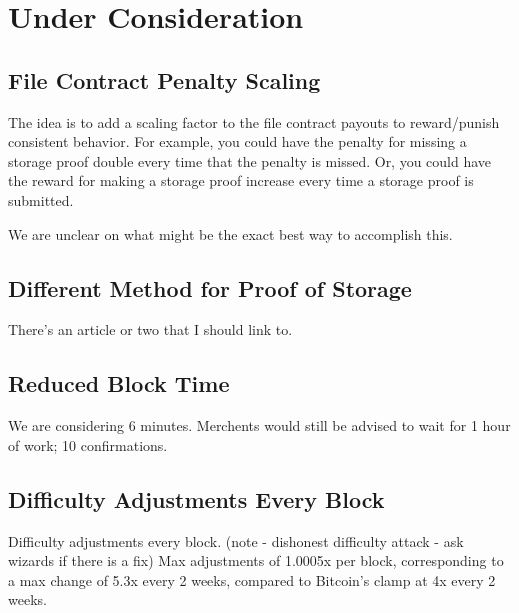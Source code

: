 \documentclass[twocolumn]{article}
\begin{document}

\section{Under Consideration}
\subsection{File Contract Penalty Scaling}
The idea is to add a scaling factor to the file contract payouts to reward/punish consistent behavior.
For example, you could have the penalty for missing a storage proof double every time that the penalty is missed.
Or, you could have the reward for making a storage proof increase every time a storage proof is submitted.

We are unclear on what might be the exact best way to accomplish this.

\subsection{Different Method for Proof of Storage}
There's an article or two that I should link to.

\subsection{Reduced Block Time}
We are considering 6 minutes.
Merchents would still be advised to wait for 1 hour of work; 10 confirmations.

\subsection{Difficulty Adjustments Every Block}
Difficulty adjustments every block. (note - dishonest difficulty attack - ask wizards if there is a fix)
Max adjustments of 1.0005x per block, corresponding to a max change of 5.3x every 2 weeks, compared to Bitcoin's clamp at 4x every 2 weeks.
\end{document}
